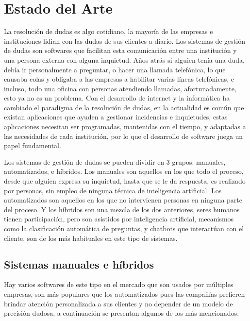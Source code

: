 \chapter{Estado del Arte}\label{chapter:state-of-the-art}

La resolución de dudas es algo cotidiano, la mayoría de las empresas e instituciones lidian con las dudas de sus clientes a diario. Los sistemas de gestión de dudas son softwares que facilitan esta comunicación entre una institución y una persona externa con alguna inquietud. Años atrás si alguien tenía una duda, debía ir personalmente a preguntar, o hacer una llamada telefónica, lo que causaba colas y obligaba a las empresas a habilitar varias líneas telefónicas, e incluso, todo una oficina con personas atendiendo llamadas, afortunadamente, esto ya no es un problema. Con el desarrollo de internet y la informática ha cambiado el paradigma de la resolución de dudas, en la actualidad es común que existan aplicaciones que ayuden a gestionar incidencias e inquietudes, estas aplicaciones necesitan ser programadas, mantenidas con el tiempo, y adaptadas a las necesidades de cada institución, por lo que el desarrollo de software juega un papel fundamental.
\newline

Los sistemas de gestión de dudas se pueden dividir en 3 grupos: manuales, automatizados, e híbridos. Los manuales son aquellos en los que todo el proceso, desde que alguien expresa su inquietud, hasta que se le da respuesta, es realizado por personas, sin empleo de ninguna técnica de inteligencia artificial. Los automatizados son aquellos en los que no intervienen personas en ninguna parte del proceso. Y los híbridos son una mezcla de los dos anteriores, seres humanos tienen participación, pero son asistidos por inteligencia artificial, mecanismos como la clasificación automática de preguntas, y chatbots que interactúan con el cliente, son de los más habituales en este tipo de sistemas. 

\section{Sistemas manuales e híbridos}

Hay varios softwares de este tipo en el mercado que son usados por múltiples empresas, son más populares que los automatizados pues las compañías prefieren brindar atención personalizada a sus clientes y no depender de un modelo de precisión dudosa, a continuación se presentan algunos de los más mencionados:
\newline

